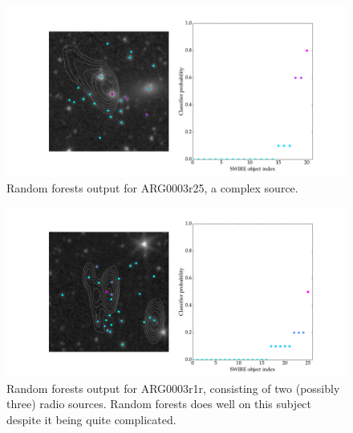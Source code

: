 \documentclass[a4paper]{article}
\begin{document}
    \begin{figure}[!ht]
      \centering
      \includegraphics[width=\linewidth]{images/ARG0003r25_rf.pdf}
      \caption{Random forests output for ARG0003r25, a complex source.}
      \label{fig:ARG0003r25_rf}
    \end{figure}

    \begin{figure}[!ht]
      \centering
      \includegraphics[width=\linewidth]{images/ARG0003r1r_rf.pdf}
      \caption{Random forests output for ARG0003r1r, consisting of two (possibly three) radio sources. Random forests does well on this subject despite it being quite complicated.}
      \label{fig:ARG0003r1r_rf}
    \end{figure}
\end{document}
